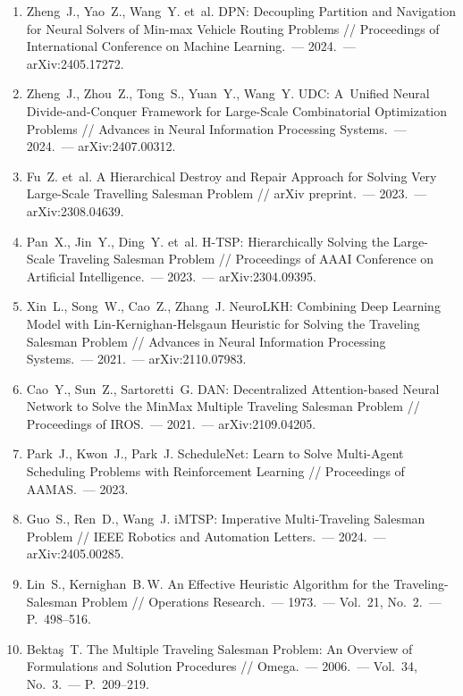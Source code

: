 \documentclass[a4paper,14pt]{extreport}
\begin{document}
\begin{enumerate}
\item Zheng~J., Yao~Z., Wang~Y. et~al. DPN: Decoupling Partition and Navigation for Neural Solvers of Min-max Vehicle Routing Problems // Proceedings of International Conference on Machine Learning.~--- 2024.~--- arXiv:2405.17272.

\item Zheng~J., Zhou~Z., Tong~S., Yuan~Y., Wang~Y. UDC: A~Unified Neural Divide-and-Conquer Framework for Large-Scale Combinatorial Optimization Problems // Advances in Neural Information Processing Systems.~--- 2024.~--- arXiv:2407.00312.

\item Fu~Z. et~al. A Hierarchical Destroy and Repair Approach for Solving Very Large-Scale Travelling Salesman Problem // arXiv preprint.~--- 2023.~--- arXiv:2308.04639.

\item Pan~X., Jin~Y., Ding~Y. et~al. H-TSP: Hierarchically Solving the Large-Scale Traveling Salesman Problem // Proceedings of AAAI Conference on Artificial Intelligence.~--- 2023.~--- arXiv:2304.09395.

\item Xin~L., Song~W., Cao~Z., Zhang~J. NeuroLKH: Combining Deep Learning Model with Lin-Kernighan-Helsgaun Heuristic for Solving the Traveling Salesman Problem // Advances in Neural Information Processing Systems.~--- 2021.~--- arXiv:2110.07983.

\item Cao~Y., Sun~Z., Sartoretti~G. DAN: Decentralized Attention-based Neural Network to Solve the MinMax Multiple Traveling Salesman Problem // Proceedings of IROS.~--- 2021.~--- arXiv:2109.04205.

\item Park~J., Kwon~J., Park~J. ScheduleNet: Learn to Solve Multi-Agent Scheduling Problems with Reinforcement Learning // Proceedings of AAMAS.~--- 2023.

\item Guo~S., Ren~D., Wang~J. iMTSP: Imperative Multi-Traveling Salesman Problem // IEEE Robotics and Automation Letters.~--- 2024.~--- arXiv:2405.00285.

\item Lin~S., Kernighan~B.\,W. An Effective Heuristic Algorithm for the Traveling-Salesman Problem // Operations Research.~--- 1973.~--- Vol.~21, No.~2.~--- P.~498--516.

\item Bektaş~T. The Multiple Traveling Salesman Problem: An Overview of Formulations and Solution Procedures // Omega.~--- 2006.~--- Vol.~34, No.~3.~--- P.~209--219.


\end{enumerate}
\end{document}
